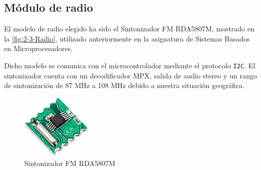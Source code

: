 \subsection{Módulo de radio}
El modelo de radio elegido ha sido el Sintonizador FM RDA5807M, mostrado en la \autoref{fig:2-3-Radio},  utilizado anteriormente en la asignatura de Sistemas Basados en Microprocesadores.

Dicho modelo se comunica con el microcontrolador mediante el protocolo \texttt{I2C}. El sintonizador cuenta con un decodificador MPX, salida de audio stereo y un rango de sintonización de 87 MHz a 108 MHz debido a nuestra situación geográfica.

\begin{figure}[h]
    \centering
    \includegraphics[width=0.3\textwidth]{images/2/2-3/Radio.jpg}
    \caption{Sintonizador FM RDA5807M}
    \label{fig:2-3-Radio}
\end{figure}